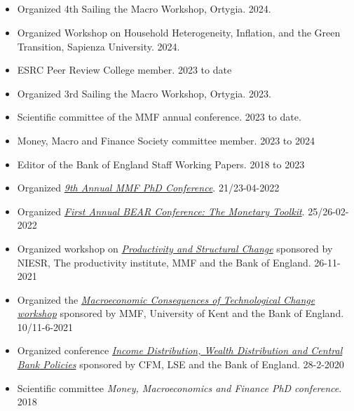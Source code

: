 \documentclass[margin, 11pt]{res} %
\begin{document}
\begin{resume}
\section{}
\begin{itemize}
\item Organized 4th Sailing the Macro Workshop, Ortygia. \hfill 2024.
\item Organized Workshop on Household Heterogeneity, Inflation, and the Green Transition, Sapienza University. \hfill 2024.
\item ESRC Peer Review College member. \hfill 2023 to date 
\item Organized 3rd Sailing the Macro Workshop, Ortygia. \hfill 2023.
\item Scientific committee of the MMF annual conference. \hfill 2023 to date.
\item Money, Macro and Finance Society committee member. \hfill 2023 to 2024 
\item Editor of the Bank of England Staff Working Papers. \hfill 2018 to 2023
\item Organized \emph{\href{https://www.mmf.ac.uk/phd/2022-phd-conference/}{9th Annual MMF PhD Conference}}. \hfill 21/23-04-2022
\item Organized \emph{\href{https://www.bankofengland.co.uk/events/2022/february/first-annual-bear-conference}{First Annual BEAR Conference: The Monetary Toolkit}}. \hfill 25/26-02-2022
\item Organized workshop on \emph{\href{https://www.mmf.ac.uk/productivity-workshop/}{Productivity and Structural Change}} sponsored by NIESR, The productivity institute, MMF and the Bank of England. \hfill 26-11-2021
\item Organized the  \emph{\href{https://www.bankofengland.co.uk/events/2021/may/mmf-workshop-on-macroeconomic-consequences-of-technological-change}{Macroeconomic Consequences of Technological Change workshop}} sponsored by MMF, University of Kent and the Bank of England. \hfill 10/11-6-2021
\item Organized conference \emph{\href{https://www.dropbox.com/s/vfv3qz5ixi32ywf/Programme.pdf?dl=0}{Income Distribution, Wealth Distribution and Central Bank Policies}} sponsored by CFM, LSE and the Bank of England. \hfill 28-2-2020
\item Scientific committee \emph{Money, Macroeconomics and Finance PhD conference}. \hfill 2018

\end{itemize}
\end{resume}
\end{document}
